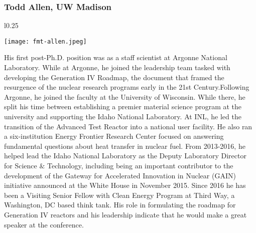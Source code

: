 \subsubsection{Todd Allen, UW Madison}
\setlength\intextsep{0pt}
\begin{wrapfigure}{l}{0.25\textwidth}
	\begin{center}
		\texttt{[image: fmt-allen.jpeg]}
	\end{center}
\end{wrapfigure}
His first post-Ph.D. position was as a staff scientist at Argonne National Laboratory. While at Argonne, he joined the leadership team tasked with developing the Generation IV Roadmap, the document that framed the resurgence of the nuclear research programs early in the 21st Century.Following Argonne, he joined the faculty at the University of Wisconsin. While there, he split his time between establishing a premier material science program at the university and supporting the Idaho National Laboratory. At INL, he led the transition of the Advanced Test Reactor into a national user facility. He also ran a six-institution Energy Frontier Research Center focused on answering fundamental questions about heat transfer in nuclear fuel.
From 2013-2016, he helped lead the Idaho National Laboratory as the Deputy Laboratory Director for Science $\&$ Technology, including being an important contributor to the development of the Gateway for Accelerated Innovation in Nuclear (GAIN) initiative announced at the White House in November 2015. Since 2016 he has been a Visiting Senior Fellow with Clean Energy Program at Third Way, a Washington, DC based think tank. His role in formulating the roadmap for Generation IV reactors and his leadership indicate that he would make a great speaker at the conference.\\

